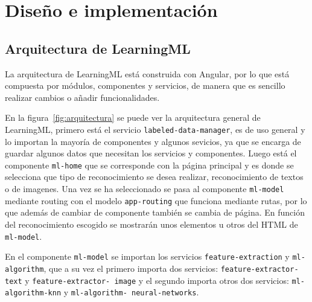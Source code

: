 \documentclass[a4paper, 12pt]{book}
\begin{document}

\cleardoublepage
\chapter{Diseño e implementación} 

\section{Arquitectura de LearningML} 
\label{sec:arquitectura}

La arquitectura de LearningML está construida con Angular, por lo que está compuesta por módulos, componentes y servicios, de manera que es sencillo realizar cambios o añadir funcionalidades. 

En la figura~\ref{fig:arquitectura} se puede ver la arquitectura general de LearningML, primero está el servicio \texttt{labeled-data-manager}, es de uso general y lo importan la mayoría de componentes y algunos sevicios, ya que se encarga de guardar  algunos datos que necesitan los servicios y componentes. Luego está el componente \texttt{ml-home} que se corresponde con la página principal y es donde se selecciona que tipo de reconocimiento se desea realizar, reconocimiento de textos o de imagenes. Una vez se ha seleccionado se pasa al componente \texttt{ml-model} mediante routing con el modelo \texttt{app-routing} que funciona mediante rutas, por lo que además de cambiar de componente también se cambia de página. En función del reconocimiento escogido se mostrarán unos elementos u otros del HTML de \texttt{ml-model}.

En el componente \texttt{ml-model} se importan los servicios \texttt{feature-extraction} y \texttt{ml-algorithm}, que a su vez el primero importa dos servicios: \texttt{feature-extractor-text} y \texttt{feature-extractor-
image} y el segundo importa otros dos servicios: \texttt{ml-algorithm-knn} y \texttt{ml-algorithm-
neural-networks}.
\end{document}
